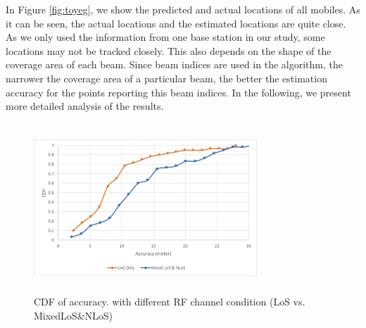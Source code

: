 \documentclass[conference, 10pt]{IEEEtran}
\begin{document}
In Figure \ref{fig:toyeg}, we show the predicted and actual locations of all mobiles. As it can be seen, the actual locations
and the estimated locations are quite close. As we only used the information from one base station in our study, some locations may not be tracked closely. This also depends on the shape of the coverage
area of each beam. Since beam indices are used in the algorithm, the narrower the coverage area of a particular beam, the better the estimation accuracy for the points reporting this beam indices.
In the following, we present more
detailed analysis of the results.

\begin{figure}[t]
\begin{center}
 \includegraphics[height=2.5in, width=3.3in]{./Accuracy_ChannelModel.png}
\caption{CDF of accuracy.\label{fig:leapperf} with different RF channel condition (LoS vs. MixedLoS\&NLoS)}
\end{center}
\end{figure}
\end{document}
